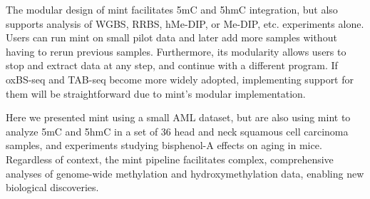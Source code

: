 The modular design of mint facilitates 5mC and 5hmC integration, but also supports analysis of WGBS, RRBS, hMe-DIP, or Me-DIP, etc. experiments alone. Users can run mint on small pilot data and later add more samples without having to rerun previous samples. Furthermore, its modularity allows users to stop and extract data at any step, and continue with a different program. If oxBS-seq and TAB-seq become more widely adopted, implementing support for them will be straightforward due to mint's modular implementation.

Here we presented mint using a small AML dataset, but are also using mint to analyze 5mC and 5hmC in a set of 36 head and neck squamous cell carcinoma samples, and experiments studying bisphenol-A effects on aging in mice. Regardless of context, the mint pipeline facilitates complex, comprehensive analyses of genome-wide methylation and hydroxymethylation data, enabling new biological discoveries.

